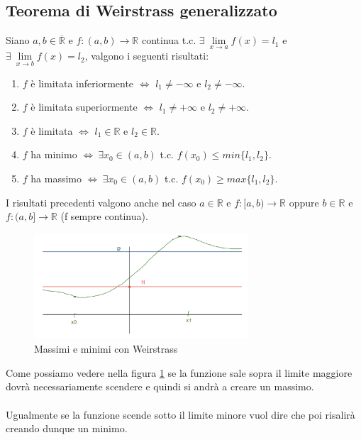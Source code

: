 \subsection{Teorema di Weirstrass generalizzato}
\begin{theorem}
Siano $a,b \in \overline{\mathbb{R}}$ e $f: (a,b) \to \mathbb{R}$ continua t.c. $\exists \: \lim\limits_{x \to a}f(x) = l_1$ e $\exists \: \lim\limits_{x \to b}f(x) = l_2$, valgono i seguenti risultati:
\begin{enumerate}
    \item $f$ è limitata inferiormente $\Longleftrightarrow$ $l_1 \neq -\infty$ e $l_2 \neq -\infty$.
    \item $f$ è limitata superiormente $\Longleftrightarrow$ $l_1 \neq +\infty$ e $l_2 \neq +\infty$.
    \item $f$ è limitata  $\Longleftrightarrow$ $l_1 \in \mathbb{R}$ e $l_2 \in \mathbb{R}$.
    \item $f$ ha minimo $\Longleftrightarrow \: \exists x_0 \in (a,b)$ t.c. $f(x_0) \leq min\{l_1, l_2\}$.
    \item $f$ ha massimo $\Longleftrightarrow \: \exists x_0 \in (a,b)$ t.c. $f(x_0) \geq max\{l_1, l_2\}$.
 \end{enumerate}
\end{theorem}
\begin{observation}
I risultati precedenti valgono anche nel caso $a \in \mathbb{R}$ e $f: [a,b) \to \mathbb{R}$ oppure $b\in \mathbb{R}$ e $f: (a,b] \to \mathbb{R}$ (f sempre continua).
\end{observation}
\begin{figure}
    \vspace{-10pt}
    \centering
    \includegraphics[width=8cm]{images/es-weirstrass-generalizzato.png}
    \vspace{-7pt}
    \caption{Massimi e minimi con Weirstrass}
    \label{fig:werstrass-generalizzato}
\end{figure}

Come possiamo vedere nella figura \ref{fig:werstrass-generalizzato} se la funzione sale sopra il limite maggiore dovrà necessariamente scendere e quindi si andrà a creare un massimo.\\\\
Ugualmente se la funzione scende sotto il limite minore vuol dire che poi risalirà creando dunque un minimo.\\\\\\

